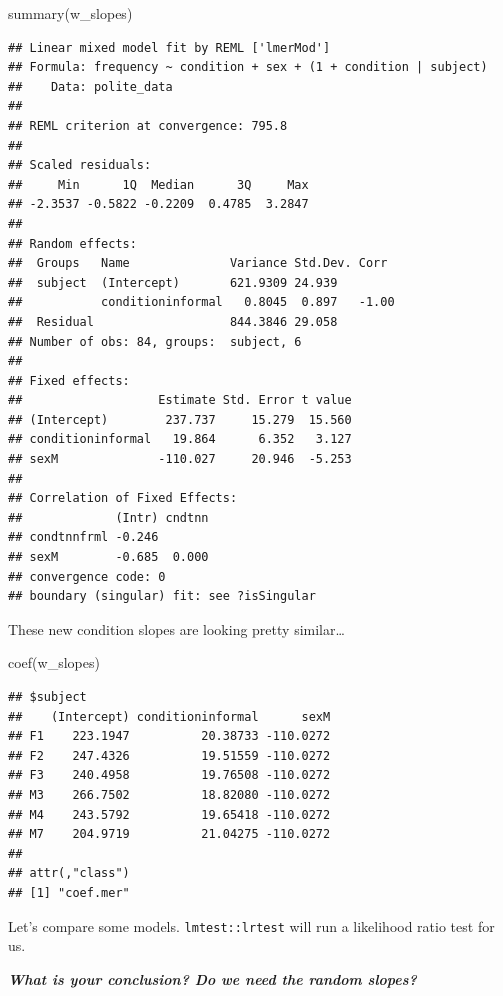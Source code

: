 \documentclass[
  openany]{book}
\newenvironment{Shaded}{\begin{snugshade}}{\end{snugshade}}
\newcommand{\FunctionTok}[1]{\textcolor[rgb]{0.00,0.00,0.00}{#1}}
\newcommand{\NormalTok}[1]{#1}
\begin{document}
\begin{Shaded}
\begin{Highlighting}[]
\FunctionTok{summary}\NormalTok{(w\_slopes)}
\end{Highlighting}
\end{Shaded}

\begin{verbatim}
## Linear mixed model fit by REML ['lmerMod']
## Formula: frequency ~ condition + sex + (1 + condition | subject)
##    Data: polite_data
## 
## REML criterion at convergence: 795.8
## 
## Scaled residuals: 
##     Min      1Q  Median      3Q     Max 
## -2.3537 -0.5822 -0.2209  0.4785  3.2847 
## 
## Random effects:
##  Groups   Name              Variance Std.Dev. Corr 
##  subject  (Intercept)       621.9309 24.939        
##           conditioninformal   0.8045  0.897   -1.00
##  Residual                   844.3846 29.058        
## Number of obs: 84, groups:  subject, 6
## 
## Fixed effects:
##                   Estimate Std. Error t value
## (Intercept)        237.737     15.279  15.560
## conditioninformal   19.864      6.352   3.127
## sexM              -110.027     20.946  -5.253
## 
## Correlation of Fixed Effects:
##             (Intr) cndtnn
## condtnnfrml -0.246       
## sexM        -0.685  0.000
## convergence code: 0
## boundary (singular) fit: see ?isSingular
\end{verbatim}

These new condition slopes are looking pretty similar\ldots{}

\begin{Shaded}
\begin{Highlighting}[]
\FunctionTok{coef}\NormalTok{(w\_slopes)}
\end{Highlighting}
\end{Shaded}

\begin{verbatim}
## $subject
##    (Intercept) conditioninformal      sexM
## F1    223.1947          20.38733 -110.0272
## F2    247.4326          19.51559 -110.0272
## F3    240.4958          19.76508 -110.0272
## M3    266.7502          18.82080 -110.0272
## M4    243.5792          19.65418 -110.0272
## M7    204.9719          21.04275 -110.0272
## 
## attr(,"class")
## [1] "coef.mer"
\end{verbatim}

Let's compare some models. \texttt{lmtest::lrtest} will run a likelihood ratio test for us.

\textbf{\emph{What is your conclusion? Do we need the random slopes?}}
\end{document}
